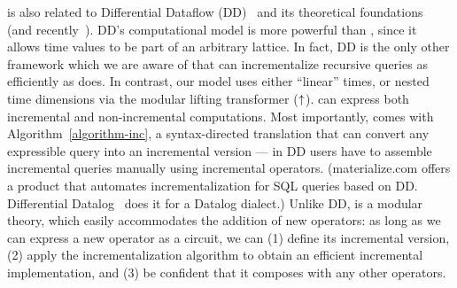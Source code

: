 \dbsp is also related to Differential Dataflow (DD)~\cite{mcsherry-cidr13,murray-sosp13}
and its theoretical foundations~\cite{abadi-fossacs15} (and recently~\cite{mcsherry-vldb20,chothia-vldb16}).
DD's computational model is more powerful than
\dbsp, since it allows time values to be part of an arbitrary lattice.
In fact, DD is the only other framework which we are aware of that can incrementalize
recursive queries as efficiently as \dbsp does.
In contrast, our model uses either ``linear'' times, or nested time dimensions via the modular lifting transformer (${\uparrow}$).
\dbsp can express both
incremental and non-incremental computations.  Most importantly, \dbsp comes with Algorithm~\ref{algorithm-inc}, a syntax-directed translation that can convert
any expressible query into an incremental version --- in DD users have
to assemble incremental queries manually using incremental operators.
(materialize.com offers a product that automates incrementalization
for SQL queries based on DD.  Differential Datalog~\cite{ryzhyk-datalog19}
does it for a Datalog dialect.)  Unlike DD, \dbsp is a modular theory,
which easily accommodates the addition of new operators:  as long as we can
express a new operator as a \dbsp circuit, we can (1) define its incremental version,
(2) apply the incrementalization algorithm to obtain an efficient
incremental implementation, and (3) be confident that it composes with any
other operators.

